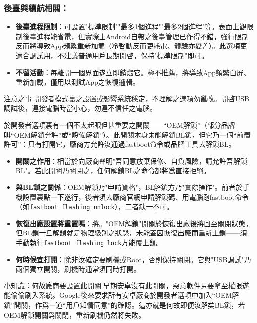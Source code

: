 \subsubsection*{後臺與續航相關：}

\begin{itemize}
  \item \textbf{後臺進程限制}：可設置"標準限制""最多1個進程""最多2個進程"等。表面上觀限制後臺進程能省電，但實際上Android自帶之後臺管理已作得不錯，強行限制反而將導致App頻繁重新加載（冷啓動反而更耗電、體驗亦變差）。此選項更適合調試用，不建議普通用戶長期開啓，保持"標準限制"即可。
  \item \textbf{不留活動}：每離開一個界面遂立即銷燬它。極不推薦，將導致App頻繁白屏、重新加載，僅用以測試App之恢復邏輯。
\end{itemize}

\begin{tcbwarn}{注意之事}
開發者模式裏之設置或影響系統穩定，不理解之選項勿亂改。開啓USB調試後，連接電腦時當小心，勿連不信任之電腦。

\end{tcbwarn}


於開發者選項裏有一個不太起眼但甚重要之開關——“OEM解鎖”（部分品牌叫“OEM解鎖允許”或“設備解鎖”）。此開關本身未能解鎖BL鎖，但它乃一個“前置許可”：只有打開它，廠商方允許汝通過fastboot命令或品牌工具去解鎖BL。

\begin{itemize}
  \item \textbf{開關之作用}：相當於向廠商聲明"吾同意放棄保修、自負風險，請允許吾解鎖BL"。若此開關乃關閉之，任何解鎖BL之命令都將爲直接拒絕。
  \item \textbf{與BL鎖之關係}：OEM解鎖乃"申請資格"，BL解鎖方乃"實際操作"。前者於手機設置裏點一下遂行，後者須去廠商官網申請解鎖碼、用電腦跑fastboot命令（如\texttt{fastboot flashing unlock}），二者缺一不可。
  \item \textbf{恢復出廠設置將重置嗎}：將。"OEM解鎖"開關於恢復出廠後將回至關閉狀態，但BL鎖一旦解鎖就是物理級別之狀態，未能蓋因恢復出廠而重新上鎖——須手動執行\texttt{fastboot flashing lock}方能覆上鎖。
  \item \textbf{何時候宜打開}：除非汝確定要刷機或Root，否則保持關閉。它與"USB調試"乃兩個獨立開關，刷機時通常須同時打開。
\end{itemize}

\begin{tcbinfo}{小知識：何故廠商要設置此開關}
早期安卓沒有此開關，惡意軟件只要拿至權限遂能偷偷刷入系統。Google後來要求所有安卓廠商於開發者選項中加入“OEM解鎖”開關，作爲一道“用戶知情同意”的確認。這亦就是何故即便汝解矣BL鎖，若OEM解鎖開關爲關閉，重新刷機仍然將失敗。

\end{tcbinfo}

